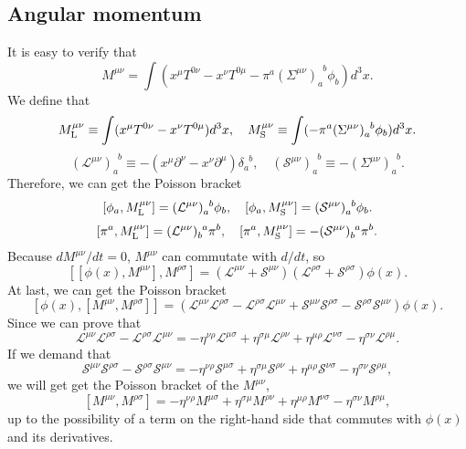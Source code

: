 \subsection{Angular momentum}
It is easy to verify that
\[M^{\mu \nu} = \int (x^{\mu}T^{0\nu}-x^{\nu}T^{0\mu}-\pi^a(\Sigma^{\mu \nu})_{a}^{\phantom{a}b}\phi_b) d^3 x.\]
We define that
\[M_{\rm L}^{\mu \nu} \equiv \int (x^{\mu}T^{0\nu}-x^{\nu}T^{0\mu}) d^3 x , \quad M_{\rm S}^{\mu \nu} \equiv \int (-\pi^a(\Sigma^{\mu \nu})_{a}^{\phantom{a}b}\phi_b) d^3 x.\]
\[(\mathcal{L}^{\mu \nu})_a^{\phantom{a}b} \equiv -(x^{\mu}\partial^{\nu}-x^{\nu}\partial^{\mu})\delta_a^{\phantom{a}b} , \quad (\mathcal{S}^{\mu \nu})_a^{\phantom{a}b} \equiv -(\Sigma^{\mu \nu})_a^{\phantom{a}b}.\]
Therefore, we can get the Poisson bracket
\[[\phi_a,M_{\rm L}^{\mu \nu}] = (\mathcal{L}^{\mu \nu})_a^{\phantom{a}b} \phi_b , \quad [\phi_a,M_{\rm S}^{\mu \nu}] = (\mathcal{S}^{\mu \nu})_a^{\phantom{a}b} \phi_b.\]
\[[\pi^a,M_{\rm L}^{\mu \nu}] = (\mathcal{L}^{\mu \nu})_b^{\phantom{b}a}\pi^{b}  , \quad [\pi^a,M_{\rm S}^{\mu \nu}] = - (\mathcal{S}^{\mu \nu})_b^{\phantom{b}a} \pi^b .\]
Because ${d M^{\mu \nu}}/{dt} = 0$, $M^{\mu \nu}$ can commutate with ${d}/{dt}$, so
\[[[\phi(x),M^{\mu \nu}],M^{\rho \sigma}] = (\mathcal{L}^{\mu \nu}+\mathcal{S}^{\mu \nu})(\mathcal{L}^{\rho \sigma}+\mathcal{S}^{\rho \sigma})\phi(x).\]
At last, we can get the Poisson bracket 
\[[\phi(x),[M^{\mu \nu},M^{\rho \sigma}]] = (\mathcal{L}^{\mu \nu}\mathcal{L}^{\rho \sigma}-\mathcal{L}^{\rho \sigma}\mathcal{L}^{\mu \nu} + \mathcal{S}^{\mu \nu}\mathcal{S}^{\rho \sigma}-\mathcal{S}^{\rho \sigma}\mathcal{S}^{\mu \nu})\phi(x).\]
Since we can prove that
\[\mathcal{L}^{\mu \nu}\mathcal{L}^{\rho \sigma}-\mathcal{L}^{\rho \sigma}\mathcal{L}^{\mu \nu} = -\eta^{\nu \rho}\mathcal{L}^{\mu \sigma} + \eta^{\sigma \mu}\mathcal{L}^{\rho \nu} + \eta^{\mu \rho}\mathcal{L}^{\nu \sigma} - \eta^{\sigma \nu}\mathcal{L}^{\rho \mu}.\]
If we demand that
\[\mathcal{S}^{\mu \nu}\mathcal{S}^{\rho \sigma}-\mathcal{S}^{\rho \sigma}\mathcal{S}^{\mu \nu} = -\eta^{\nu \rho}\mathcal{S}^{\mu \sigma} + \eta^{\sigma \mu}\mathcal{S}^{\rho \nu} + \eta^{\mu \rho}\mathcal{S}^{\nu \sigma} - \eta^{\sigma \nu}\mathcal{S}^{\rho \mu},\]
we will get get the Poisson bracket of the $M^{\mu \nu}$,
\[[M^{\mu \nu},M^{\rho \sigma}] = -\eta^{\nu \rho}M^{\mu \sigma} + \eta^{\sigma \mu}M^{\rho \nu} + \eta^{\mu \rho}M^{\nu \sigma} - \eta^{\sigma \nu}M^{\rho \mu},\]
up to the possibility of a term on the right-hand side that commutes with $\phi(x)$ and its derivatives.
\\ \\
